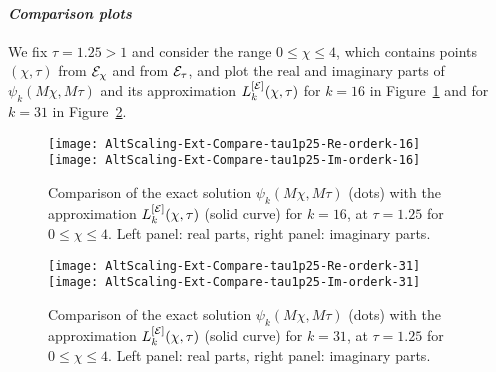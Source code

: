 \paragraph{\textit{Comparison plots}} We fix $\tau = 1.25>1$ and consider the range $0\leq \chi \leq 4$, which contains points $(\chi,\tau)$ from $\mathcal{E}_\chi$ and from $\mathcal{E}_\tau$, and plot the real and imaginary parts of $\psi_k(M\chi,M \tau)$ and its approximation $L^{[\mathcal{E}]}_k(\chi,\tau)$ for $k=16$ in Figure~\ref{f:comparison-exterior-k-16} and for $k=31$ in Figure~\ref{f:comparison-exterior-k-31}.
\begin{figure}[h]
\texttt{[image: AltScaling-Ext-Compare-tau1p25-Re-orderk-16]}\qquad
\texttt{[image: AltScaling-Ext-Compare-tau1p25-Im-orderk-16]}
\caption{Comparison of the exact solution $\psi_k(M \chi, M\tau)$ (dots) with the approximation $L_k^{[\mathcal{E}]}(\chi,\tau)$ (solid curve) for $k=16$, at $\tau=1.25$ for $0\leq \chi \leq 4$. Left panel: real parts, right panel: imaginary parts.}
\label{f:comparison-exterior-k-16}
\end{figure}
\begin{figure}[h]
\texttt{[image: AltScaling-Ext-Compare-tau1p25-Re-orderk-31]}\qquad
\texttt{[image: AltScaling-Ext-Compare-tau1p25-Im-orderk-31]}
\caption{Comparison of the exact solution $\psi_k(M \chi, M\tau)$ (dots) with the approximation $L_k^{[\mathcal{E}]}(\chi,\tau)$ (solid curve) for $k=31$, at $\tau=1.25$ for $0\leq \chi \leq 4$. Left panel: real parts, right panel: imaginary parts.}
\label{f:comparison-exterior-k-31}
\end{figure}
%
